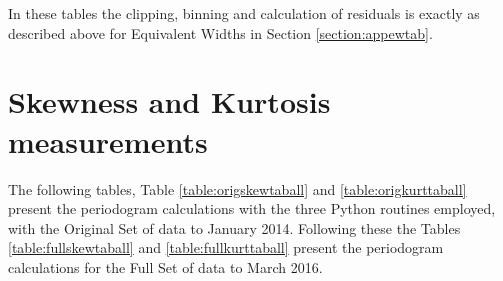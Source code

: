 \begin{table}[!htbp]
\centering
{}
\caption{This table shows the 5 highest peaks from the periodograms for Peak Ratios with various treatments of the
  Full Set of data to March 2916.}
\protect\label{table:fullprtaball}
\end{table}

In these tables the clipping, binning and calculation of residuals is exactly as described above for Equivalent Widths
in Section \ref{section:appewtab}.

\section{Skewness and Kurtosis measurements}
\protect\label{section:appkstab}

The following tables, Table \ref{table:origskewtaball} and \ref{table:origkurttaball} present the periodogram
calculations with the three Python routines employed, with the Original Set of {\harps} data to January 2014. Following
these the Tables \ref{table:fullskewtaball} and \ref{table:fullkurttaball} present the periodogram calculations for the
Full Set of data to March 2016.

